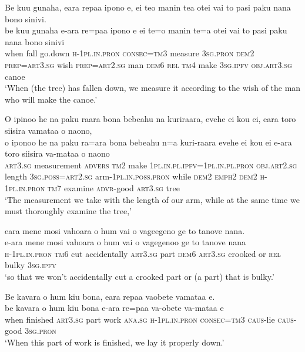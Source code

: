 \ea\label{ex:text16-6}
Be kuu gunaha, eara repaa ipono e, ei teo manin tea otei vai to pasi paku nana bono sinivi.\\
\gll be	kuu	gunaha	e-ara	re=paa	ipono	e	ei	te=o	manin	te=a	otei	vai	to	pasi	paku	nana	bono	sinivi\\
     when	fall	go.down	\textsc{h}-1\textsc{pl}.\textsc{in}.\textsc{pron}	\textsc{consec}=\textsc{tm}3	measure	3\textsc{sg}.\textsc{pron}	\textsc{dem}2	\textsc{prep}=\textsc{art}3.\textsc{sg}	wish	\textsc{prep}=\textsc{art}2.\textsc{sg}	man	\textsc{dem}6	\textsc{rel}	\textsc{tm}4	make	3\textsc{sg}.\textsc{ipfv}	\textsc{obj}.\textsc{art}3.\textsc{sg}	canoe\\
\glt `When (the tree) has fallen down, we measure it according to the wish of the man who will make the canoe.'
\z

\ea\label{ex:text16-7}
O ipinoo he na paku raara bona bebeahu na kuriraara, evehe ei kou ei, eara toro siisira vamataa o naono,\\
\gll o	iponoo	he	na	paku	ra=ara	bona	bebeahu	n=a	kuri-raara	evehe	ei	kou	ei	e-ara	toro	siisira	va-mataa	o	naono\\
     \textsc{art}3.\textsc{sg}	measurement	\textsc{advers}	\textsc{tm}2	make	1\textsc{pl}.\textsc{in}.\textsc{pl}.\textsc{ipfv}=1\textsc{pl}.\textsc{in}.\textsc{pl}.\textsc{pron}	\textsc{obj}.\textsc{art}2.\textsc{sg}	length	3\textsc{sg}.\textsc{poss}=\textsc{art}2.\textsc{sg}	arm-1\textsc{pl}.\textsc{in}.\textsc{poss}.\textsc{pron}	while	\textsc{dem}2	\textsc{emph}2	\textsc{dem}2	\textsc{h}-1\textsc{pl}.\textsc{in}.\textsc{pron}	\textsc{tm}7	examine	\textsc{advr}-good	\textsc{art}3.\textsc{sg}	tree\\
\glt `The measurement we take with the length of our arm, while at the same time we must thoroughly examine the tree,'
\z

\ea\label{ex:text16-8}
eara mene mosi vahoara o hum vai o vageegeno ge to tanove nana.\\
\gll e-ara	mene	mosi	vahoara	o	hum	vai	o	vagegenoo	ge	to	tanove	nana\\
     \textsc{h}-1\textsc{pl}.\textsc{in}.\textsc{pron}	\textsc{tm}6	cut	accidentally	\textsc{art}3.\textsc{sg}	part	\textsc{dem}6	\textsc{art}3.\textsc{sg}	crooked	or	\textsc{rel}	bulky	3\textsc{sg}.\textsc{ipfv}\\
\glt `so that we won't accidentally cut a crooked part or (a part) that is bulky.'
\z

\ea\label{ex:text16-9}
Be kavara o hum kiu bona, eara repaa vaobete vamataa e.\\
\gll be	kavara	o	hum	kiu	bona	e-ara	re=paa	va-obete va-mataa e\\
     when	finished	\textsc{art}3.\textsc{sg}	part	work	\textsc{ana}.\textsc{sg}	\textsc{h}-1\textsc{pl}.\textsc{in}.\textsc{pron}	\textsc{consec}=\textsc{tm}3	\textsc{caus}-lie	\textsc{caus}-good	3\textsc{sg}.\textsc{pron}\\
\glt `When this part of work is finished, we lay it properly down.'
\z

